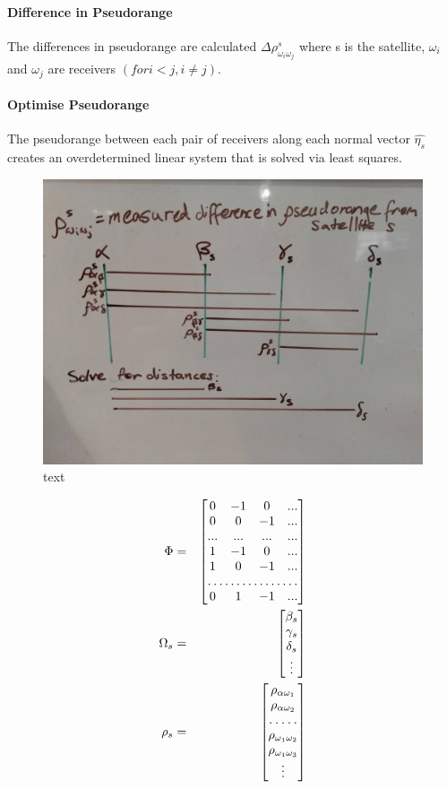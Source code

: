 \documentclass[11pt,a4paper]{article}
\begin{document}
\paragraph{Difference in Pseudorange}
The differences in pseudorange are calculated $\Delta\rho^s_{\omega_i\omega_j}$ where s is the satellite, $\omega_i$ and $\omega_j$ are receivers $(for i<j, i\neq j)$. 

\paragraph{Optimise Pseudorange}
The pseudorange between each pair of receivers along each normal vector $\hat{\eta_s}$ creates an overdetermined linear system that is solved via least squares.
\begin{figure}
\centering
\caption{text}
\label{key}
\includegraphics[width=0.7\linewidth]{solve_distances.jpg}
\end{figure}
\begin{eqnarray}
\Phi &=& \begin{bmatrix}
0 & -1 & 0 & ...\\
0 & 0 & -1 & ...\\
... & ... & ... & ... \\
1 & -1 & 0 & ...\\
1 & 0 & -1 & ...\\
\hdotsfor{4} \\
0 & 1 & -1 & ...
\end{bmatrix} \\
%
\Omega_s &=& \begin{bmatrix}
\beta_s \\
\gamma_s\\
\delta_s \\
\vdots
\end{bmatrix} \\
%
\rho_s &=& \begin{bmatrix}
\rho_{\alpha\omega_1}\\
\rho_{\alpha\omega_2}\\
\hdotsfor{1}\\
\rho_{\omega_1\omega_2}\\
\rho_{\omega_1\omega_3}\\
\vdots
\end{bmatrix} 
\end{eqnarray}
\end{document}
